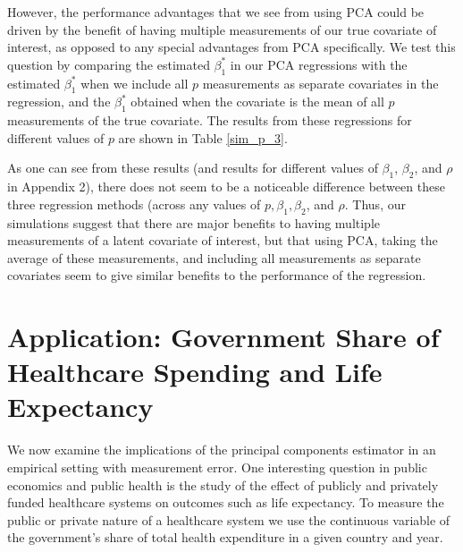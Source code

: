 \documentclass[12pt]{article}
\begin{document}
        However, the performance advantages that we see from using PCA could be driven by the benefit of having multiple measurements of our true covariate of interest, as opposed to any special advantages from PCA specifically. We test this question by comparing the estimated $\beta_1^*$ in our PCA regressions with the estimated $\beta_1^*$ when we include all $p$ measurements as separate covariates in the regression, and the $\beta_1^*$ obtained when the covariate is the mean of all $p$ measurements of the true covariate. The results from these regressions for different values of $p$ are shown in Table \ref{sim_p_3}.

        

        As one can see from these results (and results for different values of $\beta_1$, $\beta_2$, and $\rho$ in Appendix 2), there does not seem to be a noticeable difference between these three regression methods (across any values of $p, \beta_1,\beta_2$, and $\rho$. Thus, our simulations suggest that there are major benefits to having multiple measurements of a latent covariate of interest, but that using PCA, taking the average of these measurements, and including all measurements as separate covariates seem to give similar benefits to the performance of the regression.


    \section*{Application: Government Share of Healthcare Spending and Life Expectancy}

        We now examine the implications of the principal components estimator in an empirical setting with measurement error. One interesting question in public economics and public health is the study of the effect of publicly and privately funded healthcare systems on outcomes such as life expectancy. To measure the public or private nature of a healthcare system we use the continuous variable of the government's share of total health expenditure in a given country and year.
\end{document}
